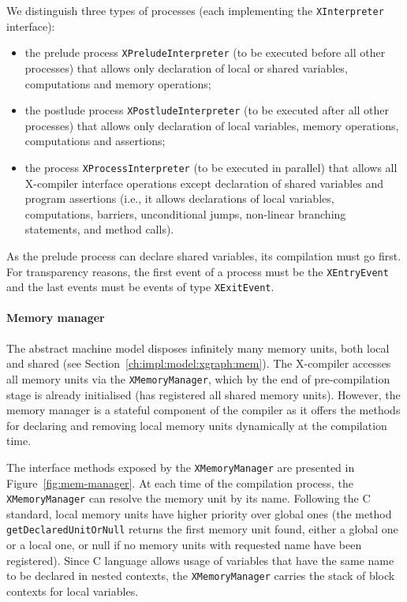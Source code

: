 We distinguish three types of processes (each implementing the \texttt{XInterpreter} interface):
\begin{itemize}[noitemsep,topsep=0pt]
\item the prelude process \texttt{XPreludeInterpreter} (to be executed before all other processes) that allows only declaration of local or shared variables, computations and memory operations;
\item the postlude process \texttt{XPostludeInterpreter} (to be executed after all other processes) that allows only declaration of local variables, memory operations, computations and assertions;
\item the process \texttt{XProcessInterpreter} (to be executed in parallel) that allows all X-compiler interface operations except declaration of shared variables %
and program assertions (i.e., it allows declarations of local variables, computations, barriers, unconditional jumps, non-linear branching statements, and method calls).
\end{itemize}

As the prelude process can declare shared variables, its compilation must go first.
For transparency reasons, the first event of a process must be the \texttt{XEntryEvent} and the last events must be events of type \texttt{XExitEvent}.


\paragraph{Memory manager}
\label{ch:impl:proc:x-compiler:mem}

The \xgraph{} abstract machine model disposes infinitely many memory units, both local and shared (see Section~\ref{ch:impl:model:xgraph:mem}).
The X-compiler accesses all memory units via the \texttt{XMemoryManager}, which by the end of pre-compilation stage is already initialised (has registered all shared memory units).
However, the memory manager is a stateful component of the compiler as it offers the methods for declaring and removing local memory units dynamically at the compilation time.

The interface methods exposed by the \texttt{XMemoryManager} are presented in Figure~\ref{fig:mem-manager}.
At each time of the compilation process, the \texttt{XMemoryManager} can resolve the memory unit by its name.
Following the C standard, local memory units have higher priority over global ones (the method \texttt{getDeclaredUnitOrNull} returns the first memory unit found, either a global one or a local one, or null if no memory units with requested name have been registered).
Since C language allows usage of variables that have the same name to be declared in nested contexts, the \texttt{XMemoryManager} carries the stack of block contexts for local variables. %

